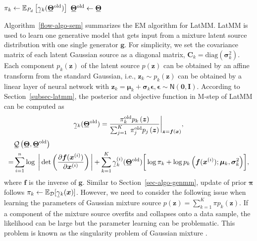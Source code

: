 \begin{algorithm}[t]
\begin{algorithmic}[1]
    \STATE $\pi_k \gets \EE_{P_d}\left[ \ubar{\gamma}_k(\ubar{\bm{\Theta}}^{\mathrm{old}}) \right]$%
    \STATE $\ubar{\bm{\Theta}}^{\mathrm{old}} \gets \ubar{\bm{\Theta}}$
    \ENDIF
    \ENDFOR
  \end{algorithmic}
\end{algorithm}


Algorithm~\ref{flow-algo-sem} summarizes the EM algorithm for LatMM.
LatMM is used to
learn one generative model that gets input from a mixture latent source
distribution with one single generator $\bm{g}$. For simplicity, we set
the covariance matrix of each latent Gaussian source as a diagonal
matrix, $\bm{C}_k = \mathrm{diag}(\bm{\sigma}_k^2) $. Each component $p_k(\bm{z})$ of
the latent source $p(\bm{z})$ can be obtained by an affine transform from
the standard Gaussian, {i.e.}, $\bm{z}_k \sim p_k(\bm{z})$ can be
obtained by a linear layer of neural network with $\bm{z}_k = \bm{\mu}_k
+ \bm{\sigma}_k \bm{\epsilon}, \bm{\epsilon} \sim \mathsf{N}(\bm{0}, \bm{I})$.
According to Section~\ref{subsec-latmm}, the posterior and objective function in M-step of LatMM can be computed as
\begin{align}\label{em-latmm-gamma}
  \ubar{\gamma}_k(\ubar{\bm{\Theta}}^{\mathrm{old}}) = \frac{\pi_k^{\mathrm{old}} p_k\left(\bm{z}\right)}{\sum_{j=1}^K\;\pi_j^{\mathrm{old}} p_j\left(\bm{z}\right)}\bigg|_{\bm{z}=\bm{f}(\bm{x})},
\end{align}
\begin{align}\label{eq-latmm-obj}
  &\ubar{\Qq}\left( \ubar{\bm{\Theta}},\ubar{\bm{\Theta}}^{\mathrm{old}}\right) \nonumber \\
    =&\sum_{i=1}^n \log\;\bigg|\det\left(
    \pd{\bm{f}(\bm{x}^{(i)})}{\bm{x}^{(i)}} \right)\bigg| 
  + \sum_{k=1}^{K}\ubar{\gamma}_k^{(i)}(\ubar{\bm{\Theta}}^{\mathrm{old}})\bigg[ \log{\pi_k}
    +\log{p_k\left(\bm{f}(\bm{x}^{(i)}); \bm{\mu}_k, \bm{\sigma}_k^2\right)}\bigg], 
\end{align}
where $\bm{f}$ is the inverse of $\bm{g}$.
Similar to Section~\ref{sec-algo-genmm}, update of prior $\bm{\pi}$
follows $\pi_k \leftarrow \EE_{\Dd}[ \ubar{\gamma}_k(\bm{x})
]$. However, we need to consider the following issue when learning the parameters of
Gaussian mixture source $p(\bm{z}) = \sum_{k=1}^K \pi p_k(\bm{z})$. If a component of the mixture source overfits and collapses onto a data sample, the likelihood can be large but the parameter learning can be problematic. This problem is known as the singularity problem of Gaussian mixture \cite{Bishop:2006:PRM:1162264}.
